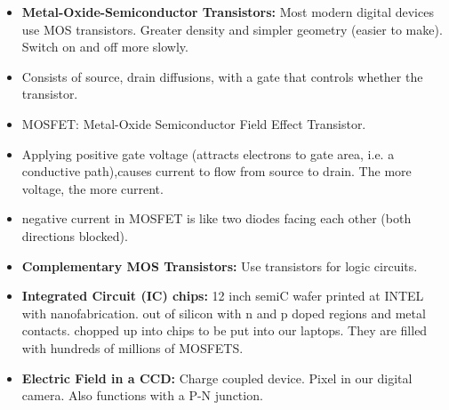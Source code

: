 \begin{itemize}
    \item \textbf{Metal-Oxide-Semiconductor Transistors:} Most modern digital devices use MOS transistors. Greater density and simpler geometry (easier to make). Switch on and off more slowly. 
    \item Consists of source, drain diffusions, with a gate that controls whether the transistor. 
    \item MOSFET: Metal-Oxide Semiconductor Field Effect Transistor.
    \item Applying positive gate voltage (attracts electrons to gate area, i.e. a conductive path),causes current to flow from source to drain. The more voltage, the more current.  
    \item negative current in MOSFET is like two diodes facing each other (both directions blocked).
    \item \textbf{Complementary MOS Transistors:} Use transistors for logic circuits.
    \item \textbf{Integrated Circuit (IC) chips:} 12 inch semiC wafer printed at INTEL with nanofabrication. out of silicon with n and p doped regions and metal contacts. chopped up into chips to be put into our laptops. They are filled with hundreds of millions of MOSFETS.
    \item \textbf{Electric Field in a CCD:} Charge coupled device. Pixel in our digital camera. Also functions with a P-N junction.

\end{itemize}